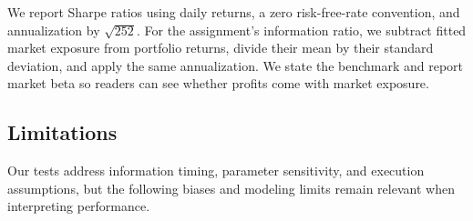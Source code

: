 \documentclass[11pt,letterpaper]{article}
\begin{document}
We report Sharpe ratios using daily returns, a zero risk-free-rate
convention, and annualization by \(\sqrt{252}\). For the assignment's
information ratio, we subtract fitted market exposure from portfolio
returns, divide their mean by their standard deviation, and apply the
same annualization. We state the benchmark and report market beta so
readers can see whether profits come with market exposure.

\subsection{Limitations}

Our tests address information timing, parameter sensitivity, and execution
assumptions, but the following biases and modeling limits remain relevant
when interpreting performance.
\end{document}
